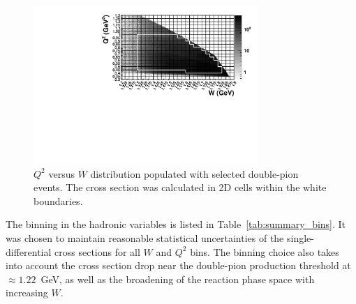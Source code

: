\documentclass[prc,twocolumn,superscriptaddress,showpacs,amssymb,amsmath,amsfonts,aps,nofootinbib]{revtex4-1}
\begin{document}
\begin{figure}[htp]
\begin{center}
 \includegraphics[width=8.5cm,keepaspectratio,trim=0mm 4mm 0mm 0mm,clip]{pictures/binning/q2vsw.pdf} 
\caption{$Q^2$ versus $W$ distribution populated with selected double-pion events. The cross section was calculated in 2D cells within the white boundaries.}
\label{fig:q2vsw}
\end{center}
\end{figure} 

The binning in the hadronic variables is listed in Table~\ref{tab:summary_bins}. It was chosen to maintain reasonable statistical uncertainties of the single-differential cross sections for all $W$ and $Q^{2}$ bins. The binning choice also takes into account the cross section drop near the double-pion production threshold at $\approx 1.22$~GeV, as well as the broadening of the reaction phase space with increasing $W$. 

\end{document}
